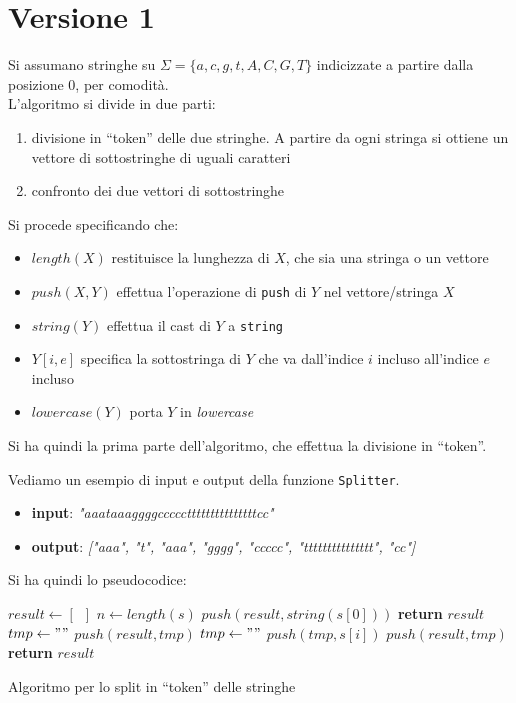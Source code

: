 \documentclass[a4paper,12pt, oneside]{book}
\begin{document}
\section{Versione 1}
Si assumano stringhe su $\Sigma=\{a,c,g,t,A,C,G,T\}$ indicizzate a partire dalla
posizione 0, per comodità.\\
L'algoritmo si divide in due parti:
\begin{enumerate}
  \item divisione in ``token'' delle due stringhe. A partire da ogni stringa si
  ottiene un vettore di sottostringhe di uguali caratteri
  \item confronto dei due vettori di sottostringhe
\end{enumerate}
Si procede specificando che:
\begin{itemize}
  \item $length(X)$ restituisce la lunghezza di $X$, che sia una stringa o un
  vettore 
  \item $push(X,Y)$ effettua l'operazione di \texttt{push} di $Y$ nel
  vettore/stringa $X$
  \item $string(Y)$ effettua il cast di $Y$ a \texttt{string}
  \item $Y[i,e]$ specifica la sottostringa di $Y$ che va dall'indice $i$ incluso
  all'indice $e$ incluso
  \item $lowercase(Y)$ porta $Y$ in \textit{lowercase}
\end{itemize}
Si ha quindi la prima parte dell'algoritmo, che effettua la divisione in
``token''.
\newpage
\begin{esempio}
  Vediamo un esempio di input e output della funzione \texttt{Splitter}.
  \begin{itemize}
    \item \textbf{input}: \textit{"aaataaaggggccccctttttttttttttttcc"}
    \item \textbf{output}: \textit{["aaa", "t", "aaa", "gggg", "ccccc",
      "ttttttttttttttt", "cc"]} 
  \end{itemize}
\end{esempio}
Si ha quindi lo pseudocodice:
\begin{algorithm}[H]
  \begin{algorithmic}[1]
    \State $result \gets \left[\,\,\,\right]$
    \State $n\gets length(s)$
    \State $push(result, string(s[0]))$
    \State \textbf{return} $result$
    \EndIf
    \State $tmp \gets ""$
    \State $push(result, tmp)$
    \State $tmp \gets ""$
    \EndIf
    \State $push(tmp, s[i])$
    \State $push(result, tmp)$
    \EndIf
    \EndFor
    \State \textbf{return} $result$
    \EndFunction
  \end{algorithmic}
  \caption{Algoritmo per lo split in ``token'' delle stringhe}
\end{algorithm}
\end{document}
